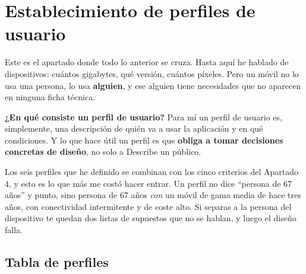 \documentclass[11pt,a4paper]{article}
\newcommand{\campo}[1]{\textbf{\color{ink}#1}}
\begin{document}
	\section{Establecimiento de perfiles de usuario}
	
	Este es el apartado donde todo lo anterior se cruza. Hasta aquí he hablado de dispositivos: cuántos gigabytes, qué versión, cuántos píxeles. Pero un móvil no lo usa una persona, lo usa \textbf{alguien}, y ese alguien tiene necesidades que no aparecen en ninguna ficha técnica.
	
	\campo{¿En qué consiste un perfil de usuario?}
	Para mí un perfil de usuario es, simplemente, una descripción de quién va a usar la aplicación y en qué condiciones. Y lo que hace útil un perfil es que \textbf{obliga a tomar decisiones concretas de diseño}, no solo a Describe un público.
	
	Los seis perfiles que he definido se combinan con los cinco criterios del Apartado 4, y esto es lo que más me costó hacer entrar. Un perfil no dice \enquote{persona de 67 años} y punto, sino persona de 67 años \emph{con} un móvil de gama media de hace tres años, con conectividad intermitente y de coste alto. Si separas a la persona del dispositivo te quedan dos listas de supuestos que no se hablan, y luego el diseño falla.
	
	\subsection{Tabla de perfiles}
	
\end{document}
